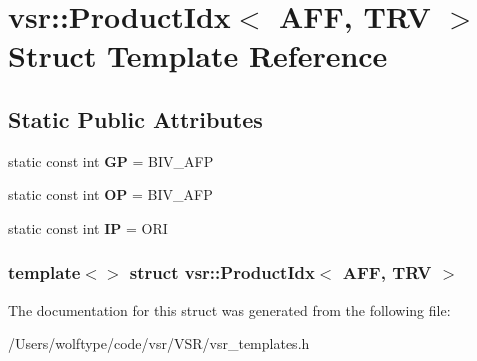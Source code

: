 \hypertarget{structvsr_1_1_product_idx_3_01_a_f_f_00_01_t_r_v_01_4}{\section{vsr\-:\-:Product\-Idx$<$ A\-F\-F, T\-R\-V $>$ Struct Template Reference}
\label{structvsr_1_1_product_idx_3_01_a_f_f_00_01_t_r_v_01_4}
}
\subsection*{Static Public Attributes}
\begin{DoxyCompactItemize}
\item 
\hypertarget{structvsr_1_1_product_idx_3_01_a_f_f_00_01_t_r_v_01_4_a8c7c44d9024c47a03f015e7aaf90898b}{static const int {\bfseries G\-P} = B\-I\-V\-\_\-\-A\-F\-P}\label{structvsr_1_1_product_idx_3_01_a_f_f_00_01_t_r_v_01_4_a8c7c44d9024c47a03f015e7aaf90898b}

\item 
\hypertarget{structvsr_1_1_product_idx_3_01_a_f_f_00_01_t_r_v_01_4_a9e36a2a7c86defa4b6dabca7cbfb8f44}{static const int {\bfseries O\-P} = B\-I\-V\-\_\-\-A\-F\-P}\label{structvsr_1_1_product_idx_3_01_a_f_f_00_01_t_r_v_01_4_a9e36a2a7c86defa4b6dabca7cbfb8f44}

\item 
\hypertarget{structvsr_1_1_product_idx_3_01_a_f_f_00_01_t_r_v_01_4_a921ebc204170063d396a1c7a1549a736}{static const int {\bfseries I\-P} = O\-R\-I}\label{structvsr_1_1_product_idx_3_01_a_f_f_00_01_t_r_v_01_4_a921ebc204170063d396a1c7a1549a736}

\end{DoxyCompactItemize}
\subsubsection*{template$<$$>$ struct vsr\-::\-Product\-Idx$<$ A\-F\-F, T\-R\-V $>$}



The documentation for this struct was generated from the following file\-:\begin{DoxyCompactItemize}
\item 
/\-Users/wolftype/code/vsr/\-V\-S\-R/vsr\-\_\-templates.\-h\end{DoxyCompactItemize}
